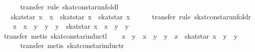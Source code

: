 \begin{isabellebody}
\ \ \ \ \isamarkupfalse%
\ {}transfer{}\ rule\ skat{}con{}star{}unfoldl{}\isanewline
\ \ \isamarkupfalse%
\ {}{}\ {}\ skat{}star\ x\ {}\ x\ {}\ skat{}star\ x\ {}\ skat{}star\ x{}\isanewline
\ \ \ \ \isamarkupfalse%
\ {}transfer{}\ rule\ skat{}con{}star{}unfoldr{}\isanewline
\ \ \isamarkupfalse%
\ {}z\ {}\ x\ {}\ y\ {}\ y\ {}\ y\ {}\ skat{}star\ x\ {}\ z\ {}\ y\ {}\ y{}\isanewline
\ \ \ \ \isamarkupfalse%
\ {}transfer{}\ metis\ skat{}con{}star{}inductl{}\isanewline
\ \ \isamarkupfalse%
\ {}z\ {}\ y\ {}\ x\ {}\ y\ {}\ y\ {}\ z\ {}\ skat{}star\ x\ {}\ y\ {}\ y{}\isanewline
\ \ \ \ \isamarkupfalse%
\ {}transfer{}\ metis\ skat{}con{}star{}inductr{}\isanewline

\end{isabellebody}
